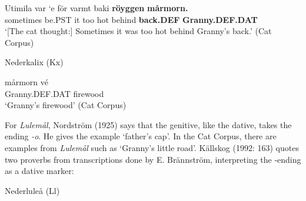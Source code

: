  \ea\label{}
\gll Utimila  var  ‘e  för  varmt  baki  \textbf{röyggen} \textbf{mårmorn.}\\


sometimes  be.PST  it  too  hot  behind  \textbf{back.DEF} \textbf{Granny.DEF.DAT}\\

\glt ‘[The cat thought:] Sometimes it was too hot behind Granny’s back.’ (Cat Corpus)

\z

\item 

Nederkalix (Kx)



 \ea\label{}
\gll mårmorn  vé\\


Granny.DEF.DAT  firewood\\

\glt ‘Granny’s firewood’  (Cat Corpus)

\z

For \textit{Lulemål}, Nordström (1925) says that the genitive, like the dative, takes the ending\textit{ {}-o}. He gives the example  ‘father’s cap’. In the Cat Corpus, there are examples from \textit{Lulemål} such as  ‘Granny’s little road’.  Källskog (1992: 163) quotes two proverbs from transcriptions done by E. Brännström, interpreting the -ending as a dative marker: 


\item 

Nederluleå (Ll)



\item 

